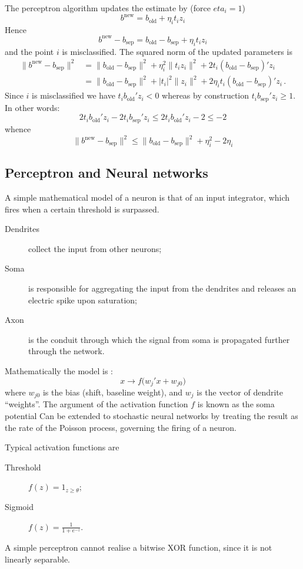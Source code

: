 \documentclass[a4paper]{article}
\begin{document}
The perceptron algorithm updates the estimate by (force $eta_i = 1$)
\[b^\text{new} = b_\text{old} + \eta_i t_i z_i\]
Hence
\[
b^\text{new} - b_\text{sep} = b_\text{old} - b_\text{sep} + \eta_i t_i z_i
\]
and the point $i$ is misclassified. The squared norm of the updated parameters is
\begin{align*}
	\|b^\text{new} - b_\text{sep}\|^2
	&= \|b_\text{old} - b_\text{sep}\|^2 + \eta_i^2 \|t_i z_i\|^2
		+ 2 t_i (b_\text{old} - b_\text{sep})'z_i \\
	&= \|b_\text{old} - b_\text{sep}\|^2 + |t_i|^2 \|z_i\|^2
		+ 2 \eta_i t_i (b_\text{old} - b_\text{sep})'z_i \,.
\end{align*}
Since $i$ is misclassified we have $t_i b_\text{old}' z_i < 0$ whereas by construction $t_i b_\text{sep}' z_i \geq 1$. In other words:
\[2 t_i b_\text{old}'z_i - 2 t_i b_\text{sep}'z_i \leq 2 t_i b_\text{old}'z_i - 2\leq -2\]
whence
\[
\|b^\text{new} - b_\text{sep}\|^2 \leq \|b_\text{old} - b_\text{sep}\|^2 + \eta_i^2 - 2 \eta_i
\]


\subsection{Perceptron and Neural networks} %
\label{sub:neural_networks}

A simple mathematical model of a neuron is that of an input integrator, which fires
when a certain threshold is surpassed.
\begin{description}
	\item[Dendrites] collect the input from other neurons;
	\item[Soma] is responsible for aggregating the input from the dendrites
	and releases an electric spike upon saturation;
	\item[Axon] is the conduit through which the signal from soma is propagated
	further through the network.
\end{description}

Mathematically the model is :
\[x\to f\bigl( w_j'x + w_{j0}\bigr)\]
where $w_{j0}$ is the bias (shift, baseline weight), and $w_j$ is the vector of
dendrite ``weights''. The argument of the activation function $f$ is known as the
soma potential Can be extended to stochastic neural networks by treating the result
as the rate of the Poisson process, governing the firing of a neuron.

Typical activation functions are \begin{description}
	\item[Threshold] $f(z) = 1_{z\geq \theta}$;
	\item[Sigmoid] $f(z) = \frac{1}{1+e^{-z}}$.
\end{description}
A simple perceptron cannot realise a bitwise XOR function, since it is not linearly
separable.
\end{document}
